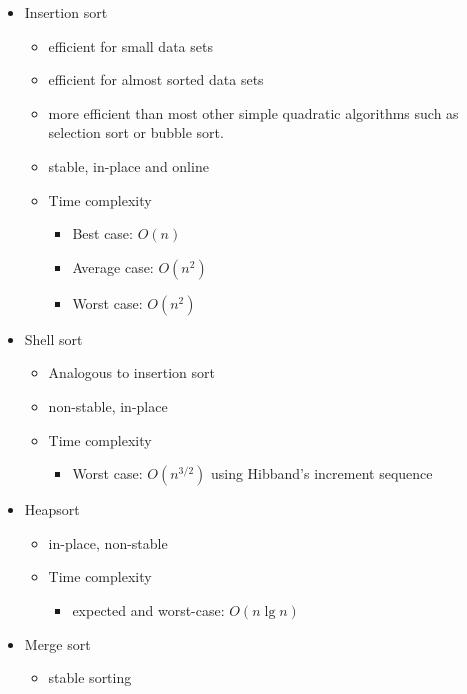 \documentclass[12pt]{article}
\begin{document}
\begin{itemize}
    \item Insertion sort
        \begin{itemize}
            \item efficient for small data sets
            \item efficient for almost sorted data sets
            \item more efficient than most other simple quadratic algorithms such
                  as selection sort or bubble sort.
            \item stable, in-place and online
            \item Time complexity
                \begin{itemize}
                    \item Best case: $O(n)$
                    \item Average case: $O(n^2)$
                    \item Worst case: $O(n^2)$
                \end{itemize}
        \end{itemize}
    \item Shell sort
        \begin{itemize}
            \item Analogous to insertion sort
            \item non-stable, in-place
            \item Time complexity
                \begin{itemize}
                    \item Worst case: $O(n^{3/2})$ using Hibband's increment
                    sequence
                \end{itemize}
        \end{itemize}
    \item Heapsort
        \begin{itemize}
            \item in-place, non-stable
            \item Time complexity
                \begin{itemize}
                    \item expected and worst-case: $O(n\lg n)$
                \end{itemize}
        \end{itemize}
    \item Merge sort
        \begin{itemize}
            \item stable sorting

\end{itemize}
\end{itemize}
\end{document}
